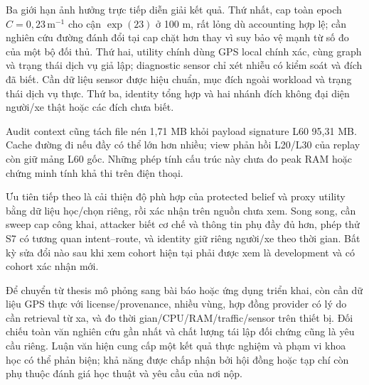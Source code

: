 Ba giới hạn ảnh hưởng trực tiếp diễn giải kết quả. Thứ nhất, cap toàn epoch $C=0{,}23\,\mathrm m^{-1}$ cho cận $\exp(23)$ ở 100 m, rất lỏng dù accounting hợp lệ; cần nghiên cứu đường đánh đổi tại cap chặt hơn thay vì suy bảo vệ mạnh từ số đo của một bộ đối thủ. Thứ hai, utility chính dùng GPS local chính xác, cùng graph và trạng thái dịch vụ giả lập; diagnostic sensor chỉ xét nhiễu có kiểm soát và đích đã biết. Cần dữ liệu sensor được hiệu chuẩn, mục đích ngoài workload và trạng thái dịch vụ thực. Thứ ba, identity tổng hợp và hai nhánh đích không đại diện người/xe thật hoặc các đích chưa biết.

Audit context cũng tách file nén 1,71 MB khỏi payload signature L60 95,31 MB. Cache đường đi nếu đầy có thể lớn hơn nhiều; view phản hồi L20/L30 của replay còn giữ mảng L60 gốc. Những phép tính cấu trúc này chưa đo peak RAM hoặc chứng minh tính khả thi trên điện thoại.

Ưu tiên tiếp theo là cải thiện độ phù hợp của protected belief và proxy utility bằng dữ liệu học/chọn riêng, rồi xác nhận trên nguồn chưa xem. Song song, cần sweep cap công khai, attacker biết cơ chế và thông tin phụ đầy đủ hơn, phép thử S7 có tương quan intent--route, và identity giữ riêng người/xe theo thời gian. Bất kỳ sửa đổi nào sau khi xem cohort hiện tại phải được xem là development và có cohort xác nhận mới.

Để chuyển từ thesis mô phỏng sang bài báo hoặc ứng dụng triển khai, còn cần dữ liệu GPS thực với license/provenance, nhiều vùng, hợp đồng provider có lý do cần retrieval từ xa, và đo thời gian/CPU/RAM/traffic/sensor trên thiết bị. Đối chiếu toàn văn nghiên cứu gần nhất và chất lượng tái lập đối chứng cũng là yêu cầu riêng. Luận văn hiện cung cấp một kết quả thực nghiệm và phạm vi khoa học có thể phản biện; khả năng được chấp nhận bởi hội đồng hoặc tạp chí còn phụ thuộc đánh giá học thuật và yêu cầu của nơi nộp.
